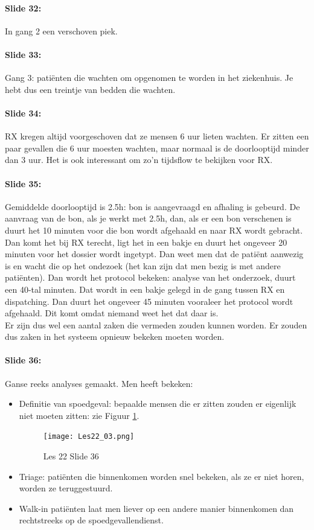 \documentclass[10pt,a4paper]{report}
\begin{document}
\paragraph{Slide 32:} In gang 2 een verschoven piek.

\paragraph{Slide 33:} Gang 3: pati\"enten die wachten om opgenomen te worden in het ziekenhuis. Je hebt dus een treintje van bedden die wachten.

\paragraph{Slide 34:} RX kregen altijd voorgeschoven dat ze mensen 6 uur lieten wachten. Er zitten een paar gevallen die 6 uur moesten wachten, maar normaal is de doorlooptijd minder dan 3 uur. Het is ook interessant om zo'n tijdsflow te bekijken voor RX.

\paragraph{Slide 35:} Gemiddelde doorlooptijd is 2.5h: bon is aangevraagd en afhaling is gebeurd. De aanvraag van de bon, als je werkt met 2.5h, dan, als er een bon verschenen is duurt het 10 minuten voor die bon wordt afgehaald en naar RX wordt gebracht. Dan komt het bij RX terecht, ligt het in een bakje en duurt het ongeveer 20 minuten voor het dossier wordt ingetypt. Dan weet men dat de pati\"ent aanwezig is en wacht die op het ondezoek (het kan zijn dat men bezig is met andere pati\"enten). Dan wordt het protocol bekeken: analyse van het onderzoek, duurt een 40-tal minuten. Dat wordt in een bakje gelegd in de gang tussen RX en dispatching. Dan duurt het ongeveer 45 minuten vooraleer het protocol wordt afgehaald. Dit komt omdat niemand weet het dat daar is.\\
Er zijn dus wel een aantal zaken die vermeden zouden kunnen worden. Er zouden dus zaken in het systeem opnieuw bekeken moeten worden.

\paragraph{Slide 36:} Ganse reeks analyses gemaakt. Men heeft bekeken:
\begin{itemize}
\item Definitie van spoedgeval: bepaalde mensen die er zitten zouden er eigenlijk niet moeten zitten: zie Figuur \ref{les22_03}.

\begin{figure}[h!]
\centering
\texttt{[image: Les22\_03.png]}
\caption{Les 22 Slide 36} 
\label{les22_03}
\end{figure}

\item Triage: pati\"enten die binnenkomen worden snel bekeken, als ze er niet horen, worden ze teruggestuurd.
\item Walk-in pati\"enten laat men liever op een andere manier binnenkomen dan rechtstreeks op de spoedgevallendienst. 
\end{itemize}
\end{document}
